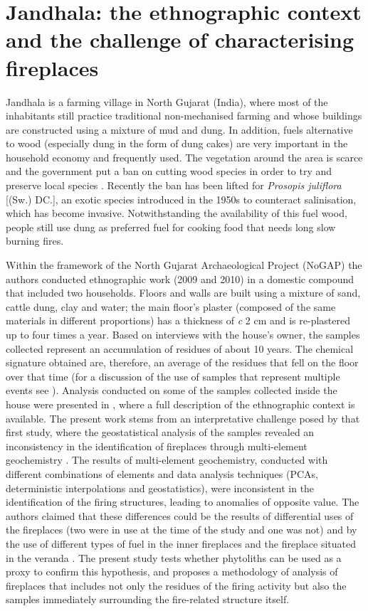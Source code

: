 \documentclass[authoryear,preprint,review,12pt]{elsarticle}
\begin{document}
\section{Jandhala: the ethnographic context and the challenge of characterising fireplaces}
\label{subsec:1.2}
Jandhala is a farming village in North Gujarat (India), where most of the inhabitants still practice traditional non-mechanised farming and whose buildings are constructed using a mixture of mud and dung. In addition, fuels alternative to wood (especially dung in the form of dung cakes) are very important in the household economy and frequently used. The vegetation around the area is scarce and the government put a ban on cutting wood species in order to try and preserve local species \citep{Lancelotti2010}. Recently the ban has been lifted for \textit{Prosopis juliflora} [(Sw.) DC.], an exotic species introduced in the 1950s to counteract salinisation, which has become invasive. Notwithstanding the availability of this fuel wood, people still use dung as preferred fuel for cooking food that needs long slow burning fires.\par
Within the framework of the North Gujarat Archaeological Project (NoGAP) \citep{antiquitygallery} the authors conducted ethnographic work (2009 and 2010) in a domestic compound that included two households. Floors and walls are built using a mixture of sand, cattle dung, clay and water; the main floor's plaster (composed of the same materials in different proportions) has a thickness of \textit{c} 2 cm and is re-plastered up to four times a year. Based on interviews with the house's owner, the samples collected represent an accumulation of residues of about 10 years. The chemical signature obtained are, therefore, an average of the residues that fell on the floor over that time (for a discussion of the use of samples that represent multiple events see \citealt{Barba1986,Middleton2010}). Analysis conducted on some of the samples collected inside the house were presented in \citet{Rondelli2014}, where a full description of the ethnographic context is available. The present work stems from an interpretative challenge posed by that first study, where the geostatistical analysis of the samples revealed an inconsistency in the identification of fireplaces through multi-element geochemistry \citep[figures 9 and 10]{Rondelli2014}. The results of multi-element geochemistry, conducted with different combinations of elements and data analysis techniques (PCAs, deterministic interpolations and geostatistics), were inconsistent in the identification of the firing structures, leading to anomalies of opposite value. The authors claimed that these differences could be the results of differential uses of the fireplaces (two were in use at the time of the study and one was not) and by the use of different types of fuel in the inner fireplaces and the fireplace situated in the veranda \citep[figure 3][and figure \ref{fig:samples} in this manuscript]{Rondelli2014}. The present study tests whether phytoliths can be used as a proxy to confirm this hypothesis, and proposes a methodology of analysis of fireplaces that includes not only the residues of the firing activity but also the samples immediately surrounding the fire-related structure itself.
\end{document}
